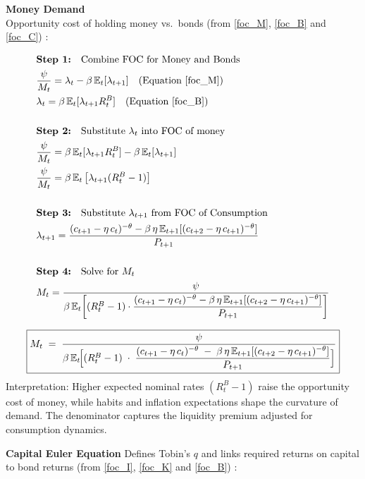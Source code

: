 \documentclass[11pt,preprint]{elsarticle}
\numberwithin{equation}{section}
\numberwithin{figure}{section}
\numberwithin{table}{section}
\begin{document}
\textbf{Money Demand}\\
Opportunity cost of holding money vs.~bonds (from \eqref{foc_M},
\eqref{foc_B} and \eqref{foc_C}) :

\begin{align*}
& \textbf{Step 1:} \quad \text{Combine FOC for Money and Bonds} \\
& \frac{\psi}{M_t} = \lambda_t - \beta\,\mathbb{E}_t[\lambda_{t+1}] \quad \text{(Equation \ref{foc_M})} \\
& \lambda_t = \beta\,\mathbb{E}_t[\lambda_{t+1}R_t^B] \quad \text{(Equation \ref{foc_B})} \\
& \\
& \textbf{Step 2:} \quad \text{Substitute } \lambda_t \text{ into FOC of money} \\
& \frac{\psi}{M_t} = \beta\,\mathbb{E}_t[\lambda_{t+1}R_t^B] - \beta\,\mathbb{E}_t[\lambda_{t+1}] \\
& \frac{\psi}{M_t} = \beta\,\mathbb{E}_t\left[\lambda_{t+1}(R_t^B - 1)\right] \\
& \\
& \textbf{Step 3:} \quad \text{Substitute } \lambda_{t+1} \text{ from FOC of Consumption} \\
& \lambda_{t+1} = \frac{(c_{t+1} - \eta\,c_t)^{-\theta} - \beta\,\eta\,\mathbb{E}_{t+1}[(c_{t+2} - \eta\,c_{t+1})^{-\theta}]}{P_{t+1}} \\
& \\
& \textbf{Step 4:} \quad \text{Solve for } M_t \\
& M_t = \frac{\psi}{\beta\,\mathbb{E}_t\!\left[ (R_t^B - 1) \cdot \dfrac{(c_{t+1} - \eta\,c_t)^{-\theta} - \beta\,\eta\,\mathbb{E}_{t+1}[(c_{t+2} - \eta\,c_{t+1})^{-\theta}]}{P_{t+1}} \right]}
\end{align*}

\begin{equation}\label{money_demand_app}
\boxed{
  M_t
  \;=\;
  \frac{\psi}
       {\beta\,\mathbb{E}_t\!\Bigl[
         (R_t^B - 1)
         \;\cdot\;
         \dfrac{(c_{t+1} - \eta\,c_t)^{-\theta}
               \;-\;
               \beta\,\eta\,\mathbb{E}_{t+1}[(c_{t+2} - \eta\,c_{t+1})^{-\theta}]}
              {P_{t+1}}
       \Bigr]}
}
\end{equation} Interpretation: Higher expected nominal rates
\((R_t^B - 1)\) raise the opportunity cost of money, while habits and
inflation expectations shape the curvature of demand. The denominator
captures the liquidity premium adjusted for consumption dynamics.

\textbf{Capital Euler Equation } Defines Tobin's \(q\) and links
required returns on capital to bond returns (from \eqref{foc_I},
\eqref{foc_K} and \eqref{foc_B}) :
\end{document}

